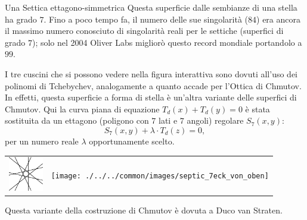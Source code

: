 \begin{surferPage}[Ettagono]{Una Settica ettagono-simmetrica}
    Questa superficie dalle sembianze di una stella ha grado $7$. Fino a poco tempo fa, il numero delle sue singolarit\`a ($84$) era ancora il massimo numero conosciuto di singolarit\`a reali per le settiche (superfici di grado $7$); solo nel 2004 Oliver Labs miglior\`o questo record mondiale portandolo a $99$.
      
    I tre cuscini che si possono vedere nella figura interattiva sono dovuti all'uso dei polinomi di Tchebychev, analogamente a quanto accade per l'Ottica di Chmutov. 
    In effetti, questa superficie a forma di stella \`e un'altra variante delle superfici di Chmutov.
    Qui la curva piana di equazione $T_d(x)+T_d(y)=0$ \`e stata sostituita da un ettagono (poligono con $7$ lati e $7$ angoli) regolare $S_7(x,y)$: 
   \[S_7(x,y) + \lambda \cdot T_d(z) = 0,\]
    per un numero reale $\lambda$ opportunamente scelto. 
    \vspace*{-0.3em}
    \begin{center}
      \begin{tabular}{c@{\qquad}c}
        \includegraphics[height=1.5cm]{./../../common/images/labsseptic1.pdf}
        &
        \texttt{[image: ./../../common/images/septic\_7eck\_von\_oben]}
      \end{tabular}
    \end{center}
    \vspace*{-0.3em}   
   Questa variante della costruzione di Chmutov \`e dovuta a Duco van Straten.
\end{surferPage}

